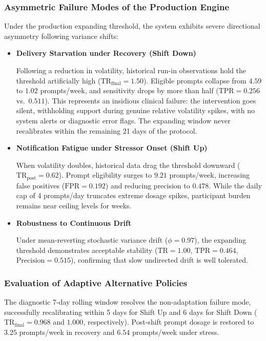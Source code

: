 \documentclass[11pt,letterpaper]{article}
\begin{document}
\subsubsection{Asymmetric Failure Modes of the Production Engine}

Under the production expanding threshold, the system exhibits severe directional asymmetry following variance shifts:
\begin{itemize} 
    \item \textbf{Delivery Starvation under Recovery (Shift Down)} 
    
    Following a reduction in volatility, historical run-in observations hold the threshold artificially high ($\text{TR}_{\text{final}} = 1.50$). Eligible prompts collapse from $4.59$ to $1.02$ prompts/week, and sensitivity drops by more than half ($\text{TPR} = 0.256$ vs.\ $0.511$). This represents an insidious clinical failure: the intervention goes silent, withholding support during genuine relative volatility spikes, with no system alerts or diagnostic error flags. The expanding window never recalibrates within the remaining 21 days of the protocol.
    
    \item \textbf{Notification Fatigue under Stressor Onset (Shift Up)} 
    
    When volatility doubles, historical data drag the threshold downward ($\text{TR}_{\text{post}} = 0.62$). Prompt eligibility surges to $9.21$ prompts/week, increasing false positives ($\text{FPR} = 0.192$) and reducing precision to $0.478$. While the daily cap of 4 prompts/day truncates extreme dosage spikes, participant burden remains near ceiling levels for weeks.
    
    \item \textbf{Robustness to Continuous Drift} 
    
    Under mean-reverting stochastic variance drift ($\phi = 0.97$), the expanding threshold demonstrates acceptable stability ($\text{TR} = 1.00$, $\text{TPR} = 0.464$, $\text{Precision} = 0.515$), confirming that slow undirected drift is well tolerated.
\end{itemize}

\subsubsection{Evaluation of Adaptive Alternative Policies}

The diagnostic 7-day rolling window resolves the non-adaptation failure mode, successfully recalibrating within 5 days for Shift Up and 6 days for Shift Down ($\text{TR}_{\text{final}} = 0.968$ and $1.000$, respectively). Post-shift prompt dosage is restored to $3.25$ prompts/week in recovery and $6.54$ prompts/week under stress. 
\end{document}
